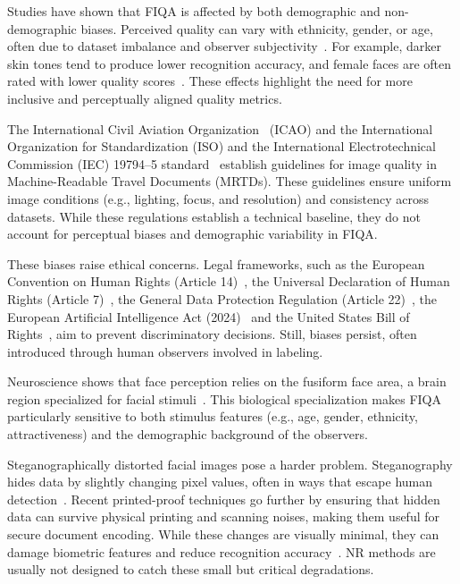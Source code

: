 Studies have shown that FIQA is affected by both demographic and non-demographic biases. Perceived quality can vary with ethnicity, gender, or age, often due to dataset imbalance and observer subjectivity~\cite{cavazos2021racebias, terhoerst2020demobias, kabbani2024demo}. For example, darker skin tones tend to produce lower recognition accuracy, and female faces are often rated with lower quality scores~\cite{huang2020facerecon}. These effects highlight the need for more inclusive and perceptually aligned quality metrics.

The International Civil Aviation Organization~\cite{icao-2015} (ICAO) and the International Organization for Standardization (ISO) and the International Electrotechnical Commission (IEC) 19794--5 standard~\cite{iso-iec29794-5-2010} establish guidelines for image quality in Machine-Readable Travel Documents (MRTDs). These guidelines ensure uniform image conditions (e.g., lighting, focus, and resolution) and consistency across datasets. While these regulations establish a technical baseline, they do not account for perceptual biases and demographic variability in FIQA.\@

These biases raise ethical concerns. Legal frameworks, such as the European Convention on Human Rights (Article 14)~\cite{echr-article14}, the Universal Declaration of Human Rights (Article 7)~\cite{udhr-article7}, the General Data Protection Regulation (Article 22)~\cite{gdpr-article22}, the European Artificial Intelligence Act (2024)~\cite{eu-ai-act-2024} and the United States Bill of Rights~\cite{us-ai-bill-rights-2022}, aim to prevent discriminatory decisions. Still, biases persist, often introduced through human observers involved in labeling.

Neuroscience shows that face perception relies on the fusiform face area, a brain region specialized for facial stimuli~\cite{kanwisher2006fusiform, tsao2008mechanisms}. This biological specialization makes FIQA particularly sensitive to both stimulus features (e.g., age, gender, ethnicity, attractiveness) and the demographic background of the observers.

Steganographically distorted facial images pose a harder problem. Steganography hides data by slightly changing pixel values, often in ways that escape human detection~\cite{steganography}. Recent printed-proof techniques go further by ensuring that hidden data can survive physical printing and scanning noises, making them useful for secure document encoding. While these changes are visually minimal, they can damage biometric features and reduce recognition accuracy~\cite{stegastamp2020, codeface2021, stampone2024, riemannian2023}. NR methods are usually not designed to catch these small but critical degradations.

